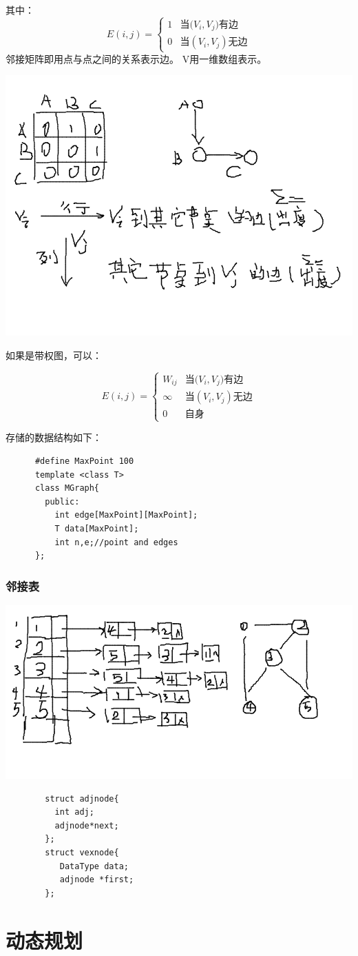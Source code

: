 \documentclass{article}
\begin{document}
		其中：
		\[
			E(i,j)=
			\left\{
				\begin{array}{ll}
					1 & \textrm{当($V_i,V_j)$有边}\\
					0 & \textrm{当$(V_i,V_j)$无边}
				\end{array}
			\right .
		\]
		邻接矩阵即用点与点之间的关系表示边。
		V用一维数组表示。

		\includegraphics[scale=0.4]{./pic/graph-02.png}

		如果是带权图，可以：

		\[
			E(i,j)=
			\left\{
				\begin{array}{ll}
					W_{ij} & \textrm{当($V_i,V_j)$有边}\\
					\infty & \textrm{当$(V_i,V_j)$无边}\\
					0	& \textrm{自身}
				\end{array}
			\right .
		\]
		
		存储的数据结构如下：
		\begin{verbatim}
      #define MaxPoint 100
      template <class T>
      class MGraph{
        public:
          int edge[MaxPoint][MaxPoint];
          T data[MaxPoint];
          int n,e;//point and edges
      };
		\end{verbatim}
		\subsubsection{邻接表}
		\includegraphics[scale=0.4]{./pic/graph-03.png}
		\begin{verbatim}
		struct adjnode{
		  int adj;
		  adjnode*next;
		};
		struct vexnode{
		   DataType data;
		   adjnode *first;
		}; 
		\end{verbatim}
		 
\section{动态规划}
\end{document}
